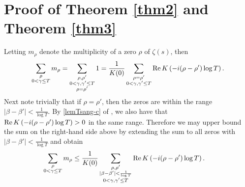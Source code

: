 \documentclass{amsart}
\newcommand{\1}{\mathbbm{1}}
\theoremstyle{remark}
\numberwithin{equation}{section}
\begin{document}
\section{Proof of Theorem \ref{thm2} and Theorem \ref{thm3}}
Letting $m_\rho$ denote the multiplicity of a zero $\rho$ of $\zeta(s)$, then
$$
\sum_{\substack{\rho \\ 0<\gamma\le T}} m_\rho = \sum_{\substack{\rho, \rho' \\ 0<\gamma,\gamma'\le T \\ \rho=\rho'}} 1
= \frac1{K(0)} \sum_{\substack{\rho=\rho' \\ 0<\gamma,\gamma'\le T}} {\rm Re}\,K\left(-i(\rho -\rho')\log{T}\right).
$$
Next note trivially that if $\rho=\rho'$, then the zeros are within the range $|\beta-\beta'|<\frac1{\log{T}}$.
By \ref{lemTsang-c} of , we also have that ${\rm Re}\,K\left(-i(\rho -\rho')\log{T}\right)>0$ in the same range.
Therefore we may upper bound the sum on the right-hand side above by extending the sum to all zeros with $|\beta-\beta'|<\frac1{\log{T}}$ and obtain
\begin{equation*}%
\begin{aligned}
\sum_{\substack{\rho \\ 0<\gamma\le T}} m_\rho
&\le \frac1{K(0)} \sum_{\substack{\rho,\rho' \\ |\beta-\beta'|<\frac1{\log{T}} \\ 0<\gamma,\gamma'\le T}} {\rm Re}\,K\left(-i(\rho -\rho')\log{T}\right).
\end{aligned}
\end{equation*}
\end{document}
